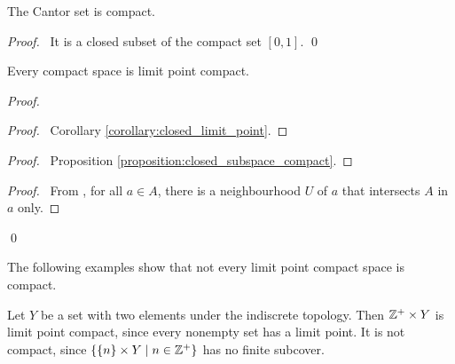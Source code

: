 \begin{example}
    The Cantor set is compact.
\end{example}

\begin{proof}
    \pf\ It is a closed subset of the compact set $[0,1]$. \qed
\end{proof}

\begin{proposition}
    \label{proposition:limit_point_compact_compact}
    Every compact space is limit point compact.
\end{proposition}

\begin{proof}
    \pf
    \begin{proof}
        \pf\ Corollary \ref{corollary:closed_limit_point}.
    \end{proof}
    \begin{proof}
        \pf\ Proposition \ref{proposition:closed_subspace_compact}.
    \end{proof}
    \begin{proof}
        \pf\ From , for all $a \in A$, there is a neighbourhood
        $U$ of $a$ that intersects $A$ in $a$ only.
    \end{proof}
    \qed
\end{proof}

The following examples show that not every limit point compact space is compact.
\begin{example}
    Let $Y$ be a set with two elements under the indiscrete topology.
    Then $\mathbb{Z}^+ \times Y$ is limit point compact, since every nonempty set has
    a limit point. It is not compact, since $\{ \{ n \} \times Y \mid n \in \mathbb{Z}^+ \}$
    has no finite subcover.
\end{example}

